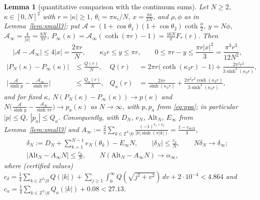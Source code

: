 \documentclass[11pt,a4paper]{article}
\newcommand{\Z}{\mathbb Z}
\theoremstyle{plain}
\newtheorem{lemma}[theorem]{Lemma}
\theoremstyle{definition}
\numberwithin{equation}{section}
\begin{document}
\begin{lemma}[quantitative comparison with the continuum sums]\label{lem:quant}
Let $N\ge2$, $\kappa\in[0,N]^2$ with $r=|\kappa|\ge1$, $\theta_i=\pi\kappa_i/N$, $x=\frac{\pi\kappa}{2N}$, and $\rho,\phi$ as in Lemma~\ref{lem:small3}; put $\mathcal A=(1+\cos\theta_1)(1+\cos\theta_2)\coth\frac\phi2$, $y=N\phi$, $\mathcal A_\infty=\frac4{|x|}=\frac{8N}{\pi r}$, $P_\infty(\kappa)=\mathcal A_\infty(\coth(\pi r)-1)=\frac{16N}{\pi}F_*(r)$. Then
\begin{equation}\label{eq:compare}
|\mathcal A-\mathcal A_\infty|\le4|x|=\frac{2\pi r}{N},\qquad\kappa_3r\le y\le\pi r,\qquad0\le\pi r-y\le\frac{\pi r|x|^2}{3}=\frac{\pi^3r^3}{12N^2},
\end{equation}
\begin{equation}\label{eq:QQa}
\begin{aligned}\big|P_N(\kappa)-P_\infty(\kappa)\big|&\le\frac{Q(r)}{N},&Q(r)&=2\pi r\big(\coth(\kappa_3r)-1\big)+\frac{2\pi^2r^2}{3\sinh^2(\kappa_3r)},\\
\Big|\frac{\mathcal A}{\sinh y}-\frac{\mathcal A_\infty}{\sinh\pi r}\Big|&\le\frac{Q_a(r)}{N},&Q_a(r)&=\frac{2\pi r}{\sinh(\kappa_3r)}+\frac{2\pi^2r^2\cosh(\kappa_3r)}{3\sinh^2(\kappa_3r)},\end{aligned}
\end{equation}
and for fixed $\kappa$, $N(P_N(\kappa)-P_\infty(\kappa))\to p(\kappa)$ and $N\big(\frac{\mathcal A}{\sinh y}-\frac{\mathcal A_\infty}{\sinh\pi r}\big)\to p_a(\kappa)$ as $N\to\infty$, with $p,p_a$ from \eqref{eq:ppa}; in particular $|p|\le Q$, $|p_a|\le Q_a$.
Consequently, with $D_N$, $e_N$, $\mathrm{Alt}_N$, $E_\infty$ from Lemma~\ref{lem:small3} and $A_\infty:=\frac2\pi\sum_{k\in\Z^2\setminus0}\frac{(-1)^{k_1+k_2}}{|k|\sinh(\pi|k|)}=\frac{1-c_{m\tau3}}{3}$,
\begin{equation}\label{eq:deltaN}
\begin{gathered}
\delta_N:=D_N+\sum_{k=1}^{N-1}e_N(\theta_k)-E_\infty N,\qquad|\delta_N|\le\frac{c_\delta}{N},\qquad N\delta_N\to\delta_\infty;\\
\big|\mathrm{Alt}_N-A_\infty N\big|\le\frac{c_a}{N},\qquad N(\mathrm{Alt}_N-A_\infty N)\to\alpha_\infty,
\end{gathered}
\end{equation}
where (certified values) $c_\delta=\frac14\sum_{k\in\Z^2\setminus0}Q(|k|)+\sum_{j\ge1}\int_0^\infty Q(\sqrt{j^2+v^2})\,dv+2\cdot10^{-4}<4.864$ and $c_a=\frac14\sum_{k\in\Z^2\setminus0}Q_a(|k|)+0.08<27.13$.
\end{lemma}
\end{document}
